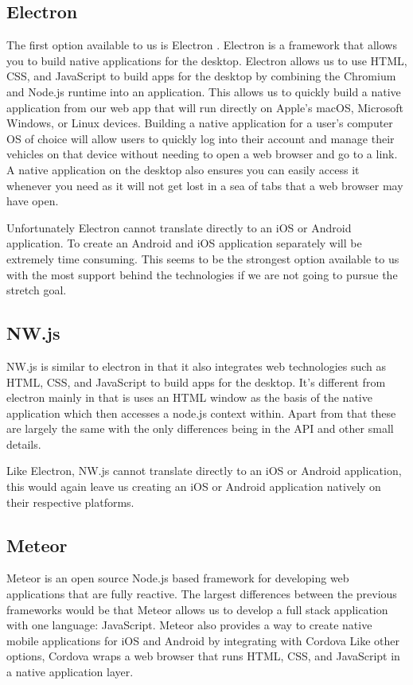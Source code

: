 \documentclass[10pt,draftclsnofoot,onecolumn,journal,compsoc]{IEEEtran}
\begin{document}
\subsection{Electron}
The first option available to us is Electron \cite{electron}. Electron is a framework that allows you to build native applications for the desktop. Electron allows us to use HTML, CSS, and JavaScript to build apps for the desktop by combining the Chromium and Node.js runtime into an application. This allows us to quickly build a native application from our web app that will run directly on Apple's macOS, Microsoft Windows, or Linux devices. Building a native application for a user's computer OS of choice will allow users to quickly log into their account and manage their vehicles on that device without needing to open a web browser and go to a link. A native application on the desktop also ensures you can easily access it whenever you need as it will not get lost in a sea of tabs that a web browser may have open. 

Unfortunately Electron cannot translate directly to an iOS or Android application. To create an Android and iOS application separately will be extremely time consuming. This seems to be the strongest option available to us with the most support behind the technologies if we are not going to pursue the stretch goal.

\subsection{NW.js}
NW.js \cite{NWjs} is similar to electron in that it also integrates web technologies such as HTML, CSS, and JavaScript to build apps for the desktop. It's different from electron mainly in that is uses an HTML window as the basis of the native application which then accesses a node.js context within. Apart from that these are largely the same with the only differences being in the API and other small details. 

Like Electron, NW.js cannot translate directly to an iOS or Android application, this would again leave us creating an iOS or Android application natively on their respective platforms. 

\subsection{Meteor}
Meteor \cite{meteor} is an open source Node.js based framework for developing web applications that are fully reactive. The largest differences between the previous frameworks would be that Meteor allows us to develop a full stack application with one language: JavaScript. Meteor also provides a way to create native mobile applications for iOS and Android by integrating with Cordova Like other options, Cordova wraps a web browser that runs HTML, CSS, and JavaScript in a native application layer. 
\end{document}
